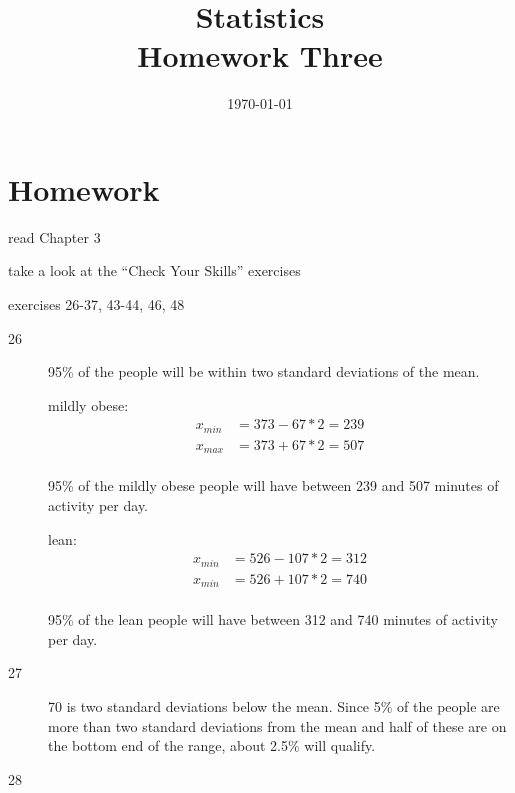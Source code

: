 \documentclass{exam}
\author{}
\date{\today}
\title{Statistics \\ Homework Three}
\begin{document}
  \maketitle

  \section{Homework}
    \begin{itemize*}
      \item read Chapter 3 
      \item take a look at the ``Check Your Skills'' exercises
      \item exercises 26-37, 43-44, 46, 48
    \end{itemize*}

  \ifprintanswers
    \begin{description}
      \item[26] 95\% of the people will be within two standard deviations of the mean.  

        mildly obese:
        \begin{align*}
          x_{min} &= 373 - 67 * 2 = 239 \\
          x_{max} &= 373 + 67 * 2 = 507 \\
        \end{align*}

        95\% of the mildly obese people will have between 239 and 507 minutes of activity
        per day.

        lean:
        \begin{align*}
          x_{min} &= 526 - 107 * 2 = 312 \\
          x_{min} &= 526 + 107 * 2 = 740 \\
        \end{align*}

        95\% of the lean people will have between 312 and 740 minutes of activity per day.

      \item[27]
        70 is two standard deviations below the mean.  Since 5\% of the people are more
        than two standard deviations from the mean and half of these are on the bottom end
        of the range, about 2.5\% will qualify. 

      \item[28]


\end{description}
\end{document}
